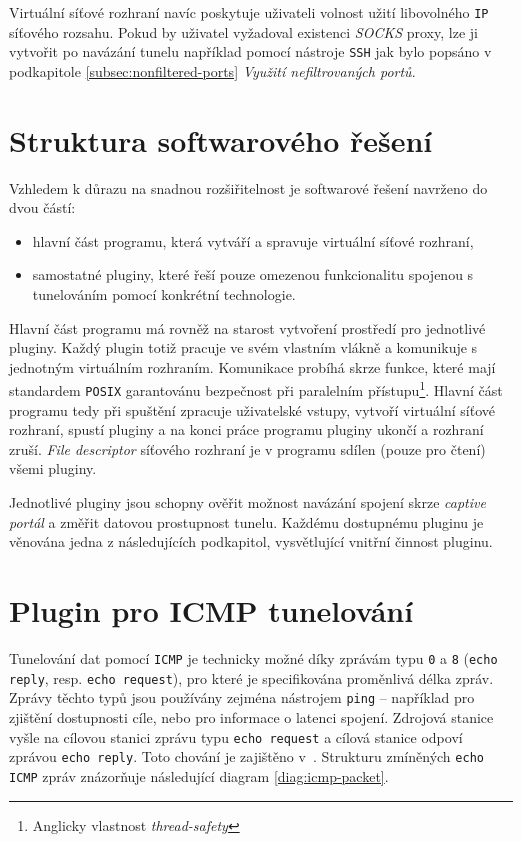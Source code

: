 \documentclass[thesis=M,czech]{FITthesis}[2012/10/20]
\begin{document}
Virtuální síťové rozhraní navíc poskytuje uživateli volnost užití libovolného \texttt{IP} síťového rozsahu. Pokud by uživatel vyžadoval existenci \textit{SOCKS} proxy, lze ji vytvořit po navázání tunelu například pomocí nástroje \texttt{SSH} jak bylo popsáno v podkapitole \ref{subsec:nonfiltered-ports} \textit{Využití nefiltrovaných portů}.

\section{Struktura softwarového řešení}

Vzhledem k důrazu na snadnou rozšiřitelnost je softwarové řešení navrženo do dvou částí:

\begin{itemize}
 \item hlavní část programu, která vytváří a spravuje virtuální síťové rozhraní,
 \item samostatné pluginy, které řeší pouze omezenou funkcionalitu spojenou s tunelováním pomocí konkrétní technologie.
\end{itemize}

Hlavní část programu má rovněž na starost vytvoření prostředí pro jednotlivé pluginy. Každý plugin totiž pracuje ve svém vlastním vlákně a komunikuje s jednotným virtuálním rozhraním. Komunikace probíhá skrze funkce, které mají standardem \texttt{POSIX} garantovánu bezpečnost při paralelním přístupu\footnote{Anglicky vlastnost \textit{thread-safety}}. Hlavní část programu tedy při spuštění zpracuje uživatelské vstupy, vytvoří virtuální síťové rozhraní, spustí pluginy a na konci práce programu pluginy ukončí a rozhraní zruší. \textit{File descriptor} síťového rozhraní je v programu sdílen (pouze pro čtení) všemi pluginy.

Jednotlivé pluginy jsou schopny ověřit možnost navázání spojení skrze \textit{captive portál} a změřit datovou prostupnost tunelu. Každému dostupnému pluginu je věnována jedna z následujících podkapitol, vysvětlující vnitřní činnost pluginu.


\section{Plugin pro ICMP tunelování}

Tunelování dat pomocí \texttt{ICMP} je technicky možné díky zprávám typu \texttt{0} a \texttt{8} (\texttt{echo reply}, resp. \texttt{echo request}), pro které je specifikována proměnlivá délka zpráv. Zprávy těchto typů jsou používány zejména nástrojem \texttt{ping} -- například pro zjištění dostupnosti cíle, nebo pro informace o latenci spojení. Zdrojová stanice vyšle na cílovou stanici zprávu typu \texttt{echo request} a cílová stanice odpoví zprávou \texttt{echo reply}. Toto chování je zajištěno v~\cite[RFC1122]{rfc1122}. Strukturu zmíněných \texttt{echo} \texttt{ICMP} zpráv znázorňuje následující diagram \ref{diag:icmp-packet}.
\end{document}

